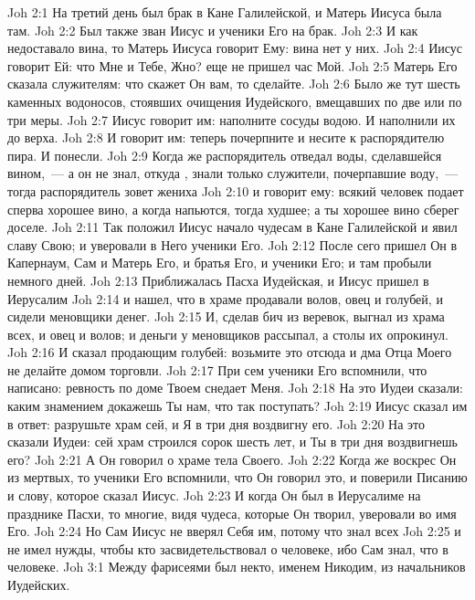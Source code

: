 \vs Joh 2:1 На третий день был брак в Кане Галилейской, и Матерь Иисуса была там.
\vs Joh 2:2 Был также зван Иисус и ученики Его на брак.
\vs Joh 2:3 И как недоставало вина, то Матерь Иисуса говорит Ему: вина нет у них.
\vs Joh 2:4 Иисус говорит Ей: что Мне и Тебе, Жно? еще не пришел час Мой.
\vs Joh 2:5 Матерь Его сказала служителям: что скажет Он вам, то сделайте.
\vs Joh 2:6 Было же тут шесть каменных водоносов, стоявших  очищения Иудейского, вмещавших по две или по три меры.
\vs Joh 2:7 Иисус говорит им: наполните сосуды водою. И наполнили их до верха.
\vs Joh 2:8 И говорит им: теперь почерпните и несите к распорядителю пира. И понесли.
\vs Joh 2:9 Когда же распорядитель отведал воды, сделавшейся вином,~--- а он не знал, откуда , знали только служители, почерпавшие воду,~--- тогда распорядитель зовет жениха
\vs Joh 2:10 и говорит ему: всякий человек подает сперва хорошее вино, а когда напьются, тогда худшее; а ты хорошее вино сберег доселе.
\vs Joh 2:11 Так положил Иисус начало чудесам в Кане Галилейской и явил славу Свою; и уверовали в Него ученики Его.
\vs Joh 2:12 После сего пришел Он в Капернаум, Сам и Матерь Его, и братья Его, и ученики Его; и там пробыли немного дней.
\vs Joh 2:13 Приближалась Пасха Иудейская, и Иисус пришел в Иерусалим
\vs Joh 2:14 и нашел, что в храме продавали волов, овец и голубей, и сидели меновщики денег.
\vs Joh 2:15 И, сделав бич из веревок, выгнал из храма всех,  и овец и волов; и деньги у меновщиков рассыпал, а столы их опрокинул.
\vs Joh 2:16 И сказал продающим голубей: возьмите это отсюда и дма Отца Моего не делайте домом торговли.
\vs Joh 2:17 При сем ученики Его вспомнили, что написано: ревность по доме Твоем снедает Меня.
\vs Joh 2:18 На это Иудеи сказали: каким знамением докажешь Ты нам, что  так поступать?
\vs Joh 2:19 Иисус сказал им в ответ: разрушьте храм сей, и Я в три дня воздвигну его.
\vs Joh 2:20 На это сказали Иудеи: сей храм строился сорок шесть лет, и Ты в три дня воздвигнешь его?
\vs Joh 2:21 А Он говорил о храме тела Своего.
\vs Joh 2:22 Когда же воскрес Он из мертвых, то ученики Его вспомнили, что Он говорил это, и поверили Писанию и слову, которое сказал Иисус.
\vs Joh 2:23 И когда Он был в Иерусалиме на празднике Пасхи, то многие, видя чудеса, которые Он творил, уверовали во имя Его.
\vs Joh 2:24 Но Сам Иисус не вверял Себя им, потому что знал всех
\vs Joh 2:25 и не имел нужды, чтобы кто засвидетельствовал о человеке, ибо Сам знал, что в человеке.
\vs Joh 3:1 Между фарисеями был некто, именем Никодим,  из начальников Иудейских.

